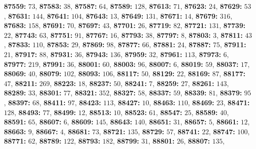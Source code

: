 \textsf{\bfseries 87559:} $73$, \textsf{\bfseries 87583:} $38$, \textsf{\bfseries 87587:} $64$, \textsf{\bfseries 87589:} $128$, \textsf{\bfseries 87613:} $71$, \textsf{\bfseries 87623:} $24$, \textsf{\bfseries 87629:} $53$, \textsf{\bfseries 87631:} $144$, \textsf{\bfseries 87641:} $104$, \textsf{\bfseries 87643:} $13$, \textsf{\bfseries 87649:} $131$, \textsf{\bfseries 87671:} $14$, \textsf{\bfseries 87679:} $316$, \textsf{\bfseries 87683:} $158$, \textsf{\bfseries 87691:} $70$, \textsf{\bfseries 87697:} $43$, \textsf{\bfseries 87701:} $26$, \textsf{\bfseries 87719:} $82$, \textsf{\bfseries 87721:} $131$, \textsf{\bfseries 87739:} $22$, \textsf{\bfseries 87743:} $63$, \textsf{\bfseries 87751:} $91$, \textsf{\bfseries 87767:} $16$, \textsf{\bfseries 87793:} $38$, \textsf{\bfseries 87797:} $8$, \textsf{\bfseries 87803:} $3$, \textsf{\bfseries 87811:} $43$, \textsf{\bfseries 87833:} $110$, \textsf{\bfseries 87853:} $29$, \textsf{\bfseries 87869:} $98$, \textsf{\bfseries 87877:} $66$, \textsf{\bfseries 87881:} $24$, \textsf{\bfseries 87887:} $75$, \textsf{\bfseries 87911:} $21$, \textsf{\bfseries 87917:} $88$, \textsf{\bfseries 87931:} $36$, \textsf{\bfseries 87943:} $136$, \textsf{\bfseries 87959:} $32$, \textsf{\bfseries 87961:} $113$, \textsf{\bfseries 87973:} $6$, \textsf{\bfseries 87977:} $219$, \textsf{\bfseries 87991:} $36$, \textsf{\bfseries 88001:} $60$, \textsf{\bfseries 88003:} $96$, \textsf{\bfseries 88007:} $6$, \textsf{\bfseries 88019:} $59$, \textsf{\bfseries 88037:} $17$, \textsf{\bfseries 88069:} $40$, \textsf{\bfseries 88079:} $102$, \textsf{\bfseries 88093:} $106$, \textsf{\bfseries 88117:} $50$, \textsf{\bfseries 88129:} $22$, \textsf{\bfseries 88169:} $87$, \textsf{\bfseries 88177:} $47$, \textsf{\bfseries 88211:} $269$, \textsf{\bfseries 88223:} $18$, \textsf{\bfseries 88237:} $50$, \textsf{\bfseries 88241:} $7$, \textsf{\bfseries 88259:} $27$, \textsf{\bfseries 88261:} $143$, \textsf{\bfseries 88289:} $33$, \textsf{\bfseries 88301:} $77$, \textsf{\bfseries 88321:} $352$, \textsf{\bfseries 88327:} $58$, \textsf{\bfseries 88337:} $59$, \textsf{\bfseries 88339:} $81$, \textsf{\bfseries 88379:} $95$, \textsf{\bfseries 88397:} $68$, \textsf{\bfseries 88411:} $97$, \textsf{\bfseries 88423:} $113$, \textsf{\bfseries 88427:} $10$, \textsf{\bfseries 88463:} $110$, \textsf{\bfseries 88469:} $23$, \textsf{\bfseries 88471:} $128$, \textsf{\bfseries 88493:} $77$, \textsf{\bfseries 88499:} $12$, \textsf{\bfseries 88513:} $10$, \textsf{\bfseries 88523:} $61$, \textsf{\bfseries 88547:} $25$, \textsf{\bfseries 88589:} $40$, \textsf{\bfseries 88591:} $65$, \textsf{\bfseries 88607:} $6$, \textsf{\bfseries 88609:} $145$, \textsf{\bfseries 88643:} $140$, \textsf{\bfseries 88651:} $31$, \textsf{\bfseries 88657:} $5$, \textsf{\bfseries 88661:} $12$, \textsf{\bfseries 88663:} $9$, \textsf{\bfseries 88667:} $4$, \textsf{\bfseries 88681:} $73$, \textsf{\bfseries 88721:} $135$, \textsf{\bfseries 88729:} $57$, \textsf{\bfseries 88741:} $22$, \textsf{\bfseries 88747:} $100$, \textsf{\bfseries 88771:} $62$, \textsf{\bfseries 88789:} $122$, \textsf{\bfseries 88793:} $182$, \textsf{\bfseries 88799:} $31$, \textsf{\bfseries 88801:} $26$, \textsf{\bfseries 88807:} $135$, 
